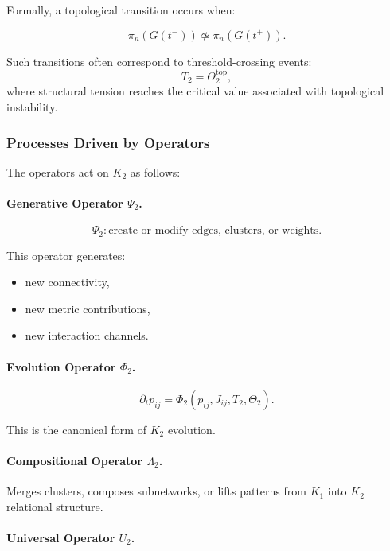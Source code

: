 Formally, a topological transition occurs when:

\[
\pi_n(G(t^-)) \not\simeq \pi_n(G(t^+)).
\]

Such transitions often correspond to threshold-crossing events:
\[
T_2 = \Theta_2^{\text{top}},
\]
where structural tension reaches the critical value associated with
topological instability.

\subsubsection{Processes Driven by Operators}

The operators act on $K_2$ as follows:

\paragraph{Generative Operator \texorpdfstring{$\Psi_2$}{\Psi_2}.}
\[
\Psi_2: \text{create or modify edges, clusters, or weights}.
\]

This operator generates:

\begin{itemize}
    \item new connectivity,
    \item new metric contributions,
    \item new interaction channels.
\end{itemize}

\paragraph{Evolution Operator \texorpdfstring{$\Phi_2$}{\Phi_2}.}

\[
\partial_t p_{ij} = \Phi_2(p_{ij}, J_{ij}, T_2, \Theta_2).
\]

This is the canonical form of $K_2$ evolution.

\paragraph{Compositional Operator \texorpdfstring{$\Lambda_2$}{\Lambda_2}.}

Merges clusters, composes subnetworks, or lifts patterns from $K_1$ into
$K_2$ relational structure.

\paragraph{Universal Operator \texorpdfstring{$U_2$}{U_2}.}

